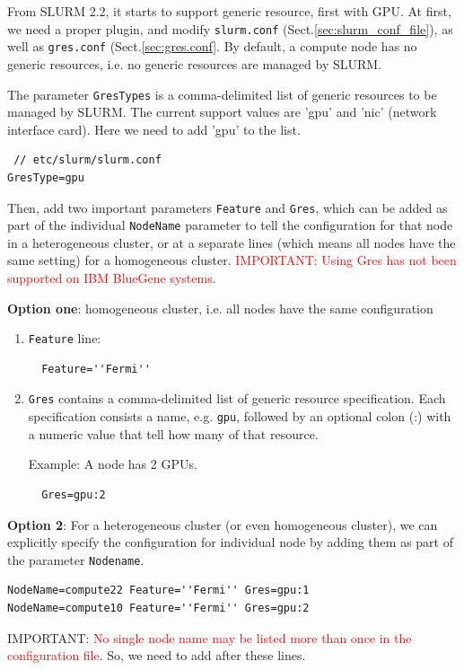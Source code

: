 From SLURM 2.2, it starts to support generic resource, first with GPU.
At first, we need a proper plugin, and modify \verb!slurm.conf!
(Sect.\ref{sec:slurm_conf_file}), as well as \verb!gres.conf!
(Sect.\ref{sec:gres.conf}. By default, a compute node has no generic resources,
i.e. no generic resources are managed by SLURM.


The parameter \verb!GresTypes! is a comma-delimited list of generic resources to
be managed by SLURM. The current support values are 'gpu' and 'nic' (network
interface card). Here we need to add 'gpu' to the list.
\begin{verbatim}
 // etc/slurm/slurm.conf
GresType=gpu
\end{verbatim}
Then, add two important parameters \verb!Feature! and \verb!Gres!, which can be
added as part of the individual \verb!NodeName! parameter to tell the
configuration for that node in a heterogeneous cluster, or at a separate lines
(which means all nodes have the same setting) for a homogeneous cluster.
\textcolor{red}{IMPORTANT: Using Gres has not been supported on IBM BlueGene
systems}.

{\bf Option one}: homogeneous cluster, i.e. all nodes have the same
configuration
\begin{enumerate}
  \item \verb!Feature! line:
  \begin{verbatim}
  Feature=''Fermi''
  \end{verbatim}

  \item \verb!Gres! contains a comma-delimited list of generic resource
  specification. Each specification consists a name, e.g. \verb!gpu!, followed
  by an optional colon (:) with a numeric value that tell how many of that
  resource.
  
Example:   A node has 2 GPUs.
  \begin{verbatim}
  Gres=gpu:2
  \end{verbatim}
\end{enumerate}

{\bf Option 2}: For a heterogeneous cluster (or even homogeneous cluster), we
can explicitly specify the configuration for individual node by adding them
as part of the parameter \verb!Nodename!.

\begin{verbatim}
NodeName=compute22 Feature=''Fermi'' Gres=gpu:1
NodeName=compute10 Feature=''Fermi'' Gres=gpu:2
\end{verbatim}
IMPORTANT: \textcolor{red}{No single node name may be listed more than once in
the configuration file}. So, we need to add after these lines.

